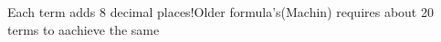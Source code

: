 \documentclass[preview]{standalone}
\begin{document}
\begin{center}
Each term adds 8 decimal places!Older formula's(Machin) requires about 20 terms to aachieve the same
\end{center}
\end{document}
